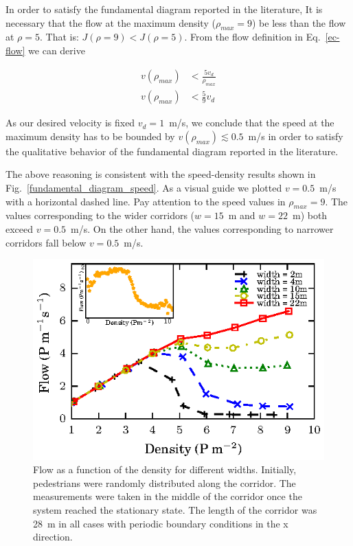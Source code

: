 In order to satisfy the fundamental diagram reported in the literature, It is necessary that the flow at the maximum density ($\rho_{max} = 9$) be less than the flow at $\rho = 5$. That is:  $J(\rho = 9) < J(\rho = 5)$. From the flow definition in Eq.~\ref{ec-flow} we can derive

\begin{align*} 
v(\rho_{max}) &< \frac{5v_d}{\rho_{max}} \\
v(\rho_{max}) &< \frac{5}{9} v_d
\end{align*}

As our desired velocity is fixed $v_d = 1$~m/s, we conclude that the speed at the maximum density has to be bounded by $v(\rho_{max}) \lesssim  0.5$~m/s in order to satisfy the qualitative behavior of the fundamental diagram reported in the literature.

The above reasoning is consistent with the speed-density results shown in Fig.~\ref{fundamental_diagram_speed}. As a visual guide we plotted $v=0.5$~m/s with a horizontal dashed line. Pay attention to the speed values in $\rho_{max} = 9$. The values corresponding to the wider corridors ($w=15$~m and $w=22$~m) both exceed $v=0.5$~m/s. On the other hand, the values corresponding to narrower corridors fall below $v=0.5$~m/s. 

\begin{figure}[htbp!]
\includegraphics[width=\columnwidth]
{plots/flow-density_vd1_multiple_widths.eps}
\caption{\label{fundamental_diagram_flow} Flow as a function of the density for different widths. Initially, 
pedestrians were randomly distributed along the corridor. The measurements were taken in the middle
of the corridor once the system reached the stationary state. The length of the corridor 
was 28~m in all cases with periodic boundary conditions in the x direction.}
\end{figure}


